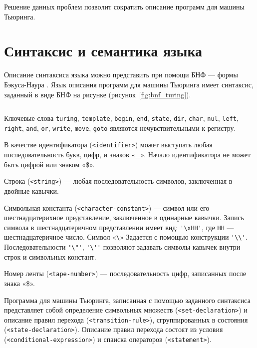 \documentclass[10pt, normalheadings]{scrartcl}
\begin{document}
Решение данных проблем позволит сократить описание программ для машины Тьюринга. 

\section*{Синтаксис и семантика языка}

Описание синтаксиса языка можно представить при помощи БНФ --- формы Бэкуса-Наура \cite[с.~17]{Serebryacov_Compillers}. Язык описания программ для машины Тьюринга имеет синтаксис, заданный в виде БНФ на рисунке (рисунок~\ref{fig:bnf_turing}).

\begin{figure*}[p]
	\centering
	\inputminted[fontsize=\footnotesize]{bnf}{bnf/turing.bnf}
	\caption{Синтаксис языка описания машины Тьюринга в форме Бэкуса --- Наура}\label{fig:bnf_turing}
\end{figure*}

Ключевые слова \texttt{turing}, \texttt{template}, \texttt{begin}, \texttt{end}, \texttt{state}, \texttt{dir}, \texttt{char}, \texttt{nul}, \texttt{left}, \texttt{right}, \texttt{and}, \texttt{or}, \texttt{write}, \texttt{move}, \texttt{goto} являются нечувствительными к регистру.

В качестве идентификатора (\verb|<identifier>|) может выступать любая последовательность букв, цифр, и знаков «\_». Начало идентификатора не может быть цифрой или знаком «\$».

Строка (\verb|<string>|) --- любая последовательность символов, заключенная в двойные кавычки.

Символьная константа (\verb|<character-constant>|) --- символ или его шестнадцатерихное представление, заключенное в одинарные кавычки. Запись символа в шестнадцатеричном представлении имеет вид: \verb|'\xHH'|, где \texttt{HH} --- шестнадцатеричное число. Символ «\verb|\|» Задается с помощью конструкции \verb|'\\'|. Последовательности \verb|'\"'|, \verb|'\''| позволяют задавать символы кавычек внутри строк и символьных констант.

Номер ленты (\verb|<tape-number>|) --- последовательность цифр, записанных после знака «\$».

Программа для машины Тьюринга, записанная с помощью заданного синтаксиса представляет собой определение символьных множеств (\verb|<set-declaration>|) и описание правил перехода (\verb|<transition-rule>|), сгруппированных в состояния (\verb|<state-declaration>|). Описание правил перехода состоят из условия (\verb|<conditional-expression>|) и спаиска операторов (\verb|<statement>|).
\end{document}
